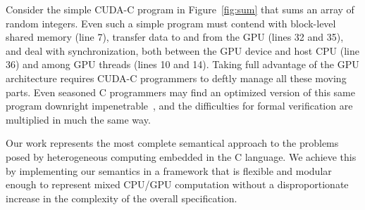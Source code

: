 Consider the simple CUDA-C program in Figure~\ref{fig:sum} that sums an array of
random integers. Even such a simple program must contend with block-level shared
memory (line 7), transfer data to and from the GPU (lines 32 and 35), and deal
with synchronization, both between the GPU device and host CPU (line 36) and
among GPU threads (lines 10 and 14). Taking full advantage of the GPU
architecture requires CUDA-C programmers to deftly manage all these moving
parts. Even seasoned C programmers may find an optimized version of this same
program downright impenetrable~\cite{harris:optimizing-reduction-cuda}, and the
difficulties for formal verification are multiplied in much the same way.

Our work represents the most complete semantical approach to the problems posed
by heterogeneous computing embedded in the C language. We achieve this by
implementing our semantics in a framework that is flexible and modular enough to
represent mixed CPU/GPU computation without a disproportionate increase in the
complexity of the overall specification.

